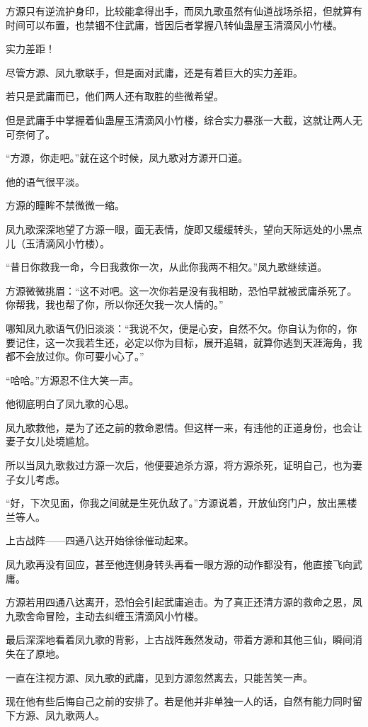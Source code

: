 \begin{this_body}
方源只有逆流护身印，比较能拿得出手，而凤九歌虽然有仙道战场杀招，但就算有时间可以布置，也禁锢不住武庸，皆因后者掌握八转仙蛊屋玉清滴风小竹楼。

实力差距！

尽管方源、凤九歌联手，但是面对武庸，还是有着巨大的实力差距。

若只是武庸而已，他们两人还有取胜的些微希望。

但是武庸手中掌握着仙蛊屋玉清滴风小竹楼，综合实力暴涨一大截，这就让两人无可奈何了。

“方源，你走吧。”就在这个时候，凤九歌对方源开口道。

他的语气很平淡。

方源的瞳眸不禁微微一缩。

凤九歌深深地望了方源一眼，面无表情，旋即又缓缓转头，望向天际远处的小黑点儿（玉清滴风小竹楼）。

“昔日你救我一命，今日我救你一次，从此你我两不相欠。”凤九歌继续道。

方源微微挑眉：“这不对吧。这一次你若是没有我相助，恐怕早就被武庸杀死了。你帮我，我也帮了你，所以你还欠我一次人情的。”

哪知凤九歌语气仍旧淡淡：“我说不欠，便是心安，自然不欠。你自认为你的，你要记住，这一次我若生还，必定以你为目标，展开追辑，就算你逃到天涯海角，我都不会放过你。你可要小心了。”

“哈哈。”方源忍不住大笑一声。

他彻底明白了凤九歌的心思。

凤九歌救他，是为了还之前的救命恩情。但这样一来，有违他的正道身份，也会让妻子女儿处境尴尬。

所以当凤九歌救过方源一次后，他便要追杀方源，将方源杀死，证明自己，也为妻子女儿考虑。

“好，下次见面，你我之间就是生死仇敌了。”方源说着，开放仙窍门户，放出黑楼兰等人。

上古战阵——四通八达开始徐徐催动起来。

凤九歌再没有回应，甚至他连侧身转头再看一眼方源的动作都没有，他直接飞向武庸。

方源若用四通八达离开，恐怕会引起武庸追击。为了真正还清方源的救命之恩，凤九歌舍命冒险，主动去纠缠玉清滴风小竹楼。

最后深深地看着凤九歌的背影，上古战阵轰然发动，带着方源和其他三仙，瞬间消失在了原地。

一直在注视方源、凤九歌的武庸，见到方源忽然离去，只能苦笑一声。

现在他有些后悔自己之前的安排了。若是他并非单独一人的话，自然有能力同时留下方源、凤九歌两人。


\end{this_body}
